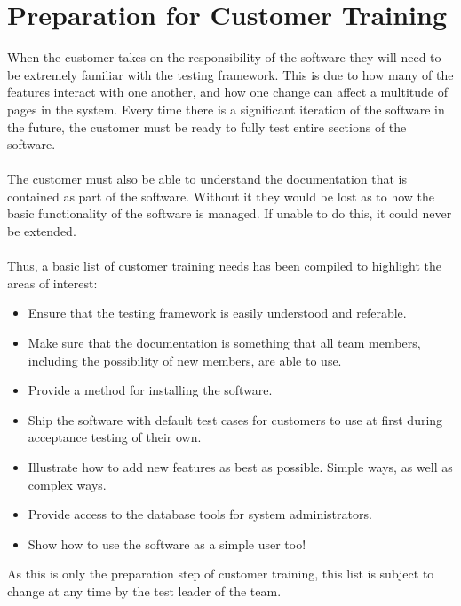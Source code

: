 \documentclass[14pt]{article}
\begin{document}
\section{Preparation for Customer Training}
When the customer takes on the responsibility of the software they will need to be extremely familiar with the testing framework. This is due to how many of the features interact with one another, and how one change can affect a multitude of pages in the system. Every time there is a significant iteration of the software in the future, the customer must be ready to fully test entire sections of the software. \\ \\
The customer must also be able to understand the documentation that is contained as part of the software. Without it they would be lost as to how the basic functionality of the software is managed. If unable to do this, it could never be extended.\\ \\
Thus, a basic list of customer training needs has been compiled to highlight the areas of interest:
\begin{itemize}
	\item Ensure that the testing framework is easily understood and referable.
	\item Make sure that the documentation is something that all team members, including the possibility of new members, are able to use.
	\item Provide a method for installing the software.
	\item Ship the software with default test cases for customers to use at first during acceptance testing of their own.
	\item Illustrate how to add new features as best as possible. Simple ways, as well as complex ways.
	\item Provide access to the database tools for system administrators.
	\item Show how to use the software as a simple user too!
\end{itemize}
As this is only the preparation step of customer training, this list is subject to change at any time by the test leader of the team.
\end{document}
